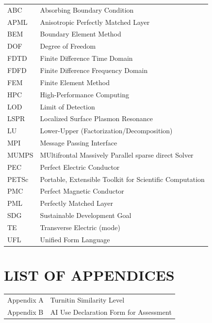 \documentclass[12pt, a4paper]{report}
\begin{document}
\begin{tabular}{@{} p{3cm} p{11cm} @{}}
ABC   & Absorbing Boundary Condition \\[0.3em]
APML  & Anisotropic Perfectly Matched Layer \\[0.3em]
BEM   & Boundary Element Method \\[0.3em]
DOF   & Degree of Freedom \\[0.3em]
FDTD  & Finite Difference Time Domain \\[0.3em]
FDFD  & Finite Difference Frequency Domain \\[0.3em]
FEM   & Finite Element Method \\[0.3em]
HPC   & High-Performance Computing \\[0.3em]
LOD   & Limit of Detection \\[0.3em]
LSPR  & Localized Surface Plasmon Resonance \\[0.3em]
LU    & Lower-Upper (Factorization/Decomposition) \\[0.3em]
MPI   & Message Passing Interface \\[0.3em]
MUMPS & MUltifrontal Massively Parallel sparse direct Solver \\[0.3em]
PEC   & Perfect Electric Conductor \\[0.3em]
PETSc & Portable, Extensible Toolkit for Scientific Computation \\[0.3em]
PMC   & Perfect Magnetic Conductor \\[0.3em]
PML   & Perfectly Matched Layer \\[0.3em]
SDG   & Sustainable Development Goal \\[0.3em]
TE    & Transverse Electric (mode) \\[0.3em]
UFL   & Unified Form Language \\[0.3em]
\end{tabular}

\clearpage
\chapter*{LIST OF APPENDICES}

\begin{tabular}{@{} p{3cm} p{11cm} @{}}
Appendix A & Turnitin Similarity Level \\[0.5em]
Appendix B & AI Use Declaration Form for Assessment \\
\end{tabular}
\end{document}
